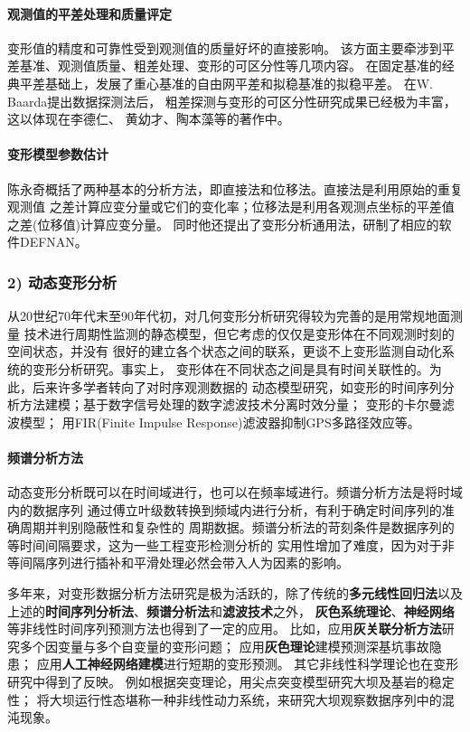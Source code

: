 \paragraph*{观测值的平差处理和质量评定}
变形值的精度和可靠性受到观测值的质量好坏的直接影响。
该方面主要牵涉到平差基准、观测值质量、粗差处理、变形的可区分性等几项内容。
在固定基准的经典平差基础上，发展了重心基准的自由网平差和拟稳基准的拟稳平差。
在W. Baarda提出数据探测法后，
粗差探测与变形的可区分性研究成果已经极为丰富，这以体现在李德仁、
黄幼才、陶本藻等的著作中。
\paragraph*{变形模型参数估计}
陈永奇概括了两种基本的分析方法，即直接法和位移法。直接法是利用原始的重复观测值
之差计算应变分量或它们的变化率；位移法是利用各观测点坐标的平差值之差(位移值)计算应变分量。
同时他还提出了变形分析通用法，研制了相应的软件DEFNAN。

\subsubsection*{2) 动态变形分析}
从20世纪70年代末至90年代初，对几何变形分析研究得较为完善的是用常规地面测量
技术进行周期性监测的静态模型，但它考虑的仅仅是变形体在不同观测时刻的空间状态，并没有
很好的建立各个状态之间的联系，更谈不上变形监测自动化系统的变形分析研究。事实上，
变形体在不同状态之间是具有时间关联性的。为此，后来许多学者转向了对时序观测数据的
动态模型研究，如变形的时间序列分析方法建模；基于数字信号处理的数字滤波技术分离时效分量；
变形的卡尔曼滤波模型；
用FIR(Finite Impulse Response)滤波器抑制GPS多路径效应等。
\paragraph*{频谱分析方法}
动态变形分析既可以在时间域进行，也可以在频率域进行。频谱分析方法是将时域内的数据序列
通过傅立叶级数转换到频域内进行分析，有利于确定时间序列的准确周期并判别隐蔽性和复杂性的
周期数据。频谱分析法的苛刻条件是数据序列的等时间间隔要求，这为一些工程变形检测分析的
实用性增加了难度，因为对于非等间隔序列进行插补和平滑处理必然会带入人为因素的影响。

多年来，对变形数据分析方法研究是极为活跃的，除了传统的\textbf{多元线性回归法}以及
上述的\textbf{时间序列分析法}、\textbf{频谱分析法}和\textbf{滤波技术}之外，
\textbf{灰色系统理论}、\textbf{神经网络}等非线性时间序列预测方法也得到了一定的应用。
比如，应用\textbf{灰关联分析方法}研究多个因变量与多个自变量的变形问题；
应用\textbf{灰色理论}建模预测深基坑事故隐患；
应用\textbf{人工神经网络建模}进行短期的变形预测。
其它非线性科学理论也在变形研究中得到了反映。
例如根据突变理论，用尖点突变模型研究大坝及基岩的稳定性；
将大坝运行性态堪称一种非线性动力系统，来研究大坝观察数据序列中的混沌现象。

